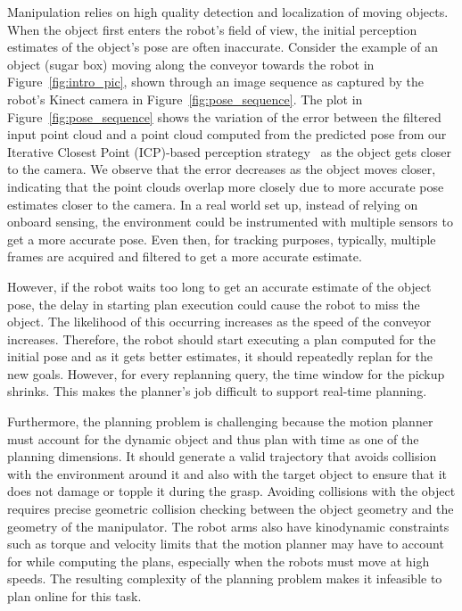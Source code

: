 \documentclass[a4paper]{report}
\begin{document}
Manipulation relies on high quality detection and localization of moving objects. When the object first enters the robot's field of view, the initial perception estimates of the object's pose are often inaccurate. Consider the example of an object (sugar box) moving along the conveyor towards the robot in Figure~\ref{fig:intro_pic}, shown through an image sequence as captured by the robot's Kinect camera in Figure~\ref{fig:pose_sequence}. 
%
The plot in Figure~\ref{fig:pose_sequence} shows the variation of the error between the filtered input point cloud and a point cloud computed from the predicted pose from our Iterative Closest Point (ICP)-based perception strategy~\cite{narayanan2016perch} as the object gets closer to the camera. We observe that the error decreases as the object moves closer, indicating that the point clouds overlap more closely due to more accurate pose estimates closer to the camera.
In a real world set up, instead of relying on onboard sensing, the environment could be instrumented with multiple sensors to get a more accurate pose. Even then, for tracking purposes, typically, multiple frames are acquired and filtered to get a more accurate estimate.

However, if the robot waits too long to get an accurate estimate of the object pose, the delay in starting plan execution could cause the robot to miss the object. The likelihood of this occurring increases as the speed of the conveyor increases. Therefore, the robot should start executing a plan computed for the initial pose and as it gets better estimates, it should repeatedly replan for the new goals. However, for every replanning query, the time window for the pickup shrinks. This makes the planner's job difficult to support real-time planning.


Furthermore, the planning problem is challenging because the motion planner must account for the dynamic object and thus plan with time as one of the planning dimensions. It should generate a valid trajectory that avoids collision with the environment around it and also with the target object to ensure that it does not damage or topple it during the grasp. Avoiding collisions with the object requires precise geometric collision checking between the object geometry and the geometry of the manipulator.
The robot arms also have kinodynamic constraints such as torque and velocity limits that the motion planner may have to account for while computing the plans, especially when the robots must move at high speeds.
The resulting complexity of the planning problem makes it infeasible to plan online for this task.
\end{document}
